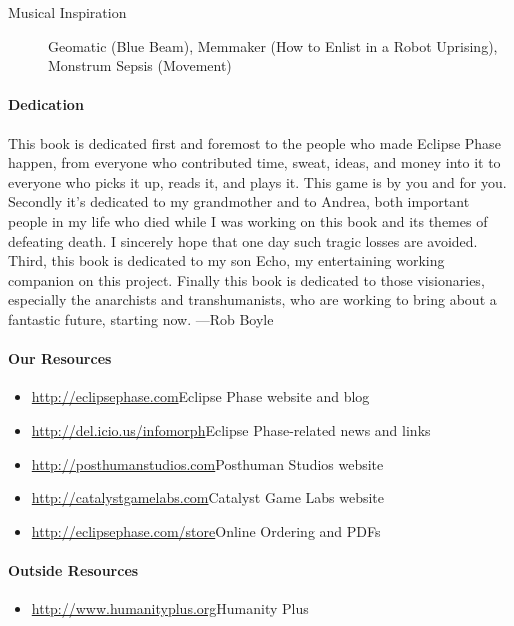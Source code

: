 \begin{description}
\item[Musical Inspiration] Geomatic (Blue Beam), Memmaker (How to Enlist in a
  Robot Uprising), Monstrum Sepsis (Movement)
  
\end{description}

\pagebreak

\paragraph{Dedication}

This book is dedicated first and foremost to the people who made Eclipse Phase
happen, from everyone who contributed time, sweat, ideas, and money into it to
everyone who picks it up, reads it, and plays it. This game is by you and for
you.  Secondly it's dedicated to my grandmother and to Andrea, both important
people in my life who died while I was working on this book and its themes of
defeating death. I sincerely hope that one day such tragic losses are
avoided. Third, this book is dedicated to my son Echo, my entertaining working
companion on this project. Finally this book is dedicated to those visionaries,
especially the anarchists and transhumanists, who are working to bring about a
fantastic future, starting now. —Rob Boyle

\paragraph{Our Resources}

\begin{itemize}
\item \url{http://eclipsephase.com}{Eclipse Phase website and blog}
\item \url{http://del.icio.us/infomorph}{Eclipse Phase-related news and links}
\item \url{http://posthumanstudios.com}{Posthuman Studios website}
\item \url{http://catalystgamelabs.com}{Catalyst Game Labs website}
\item \url{http://eclipsephase.com/store}{Online Ordering and PDFs}
\end{itemize}

\paragraph{Outside Resources}
\label{sec:outside-resources}

\begin{itemize}
\item \url{http://www.humanityplus.org}{Humanity Plus}
\end{itemize}

